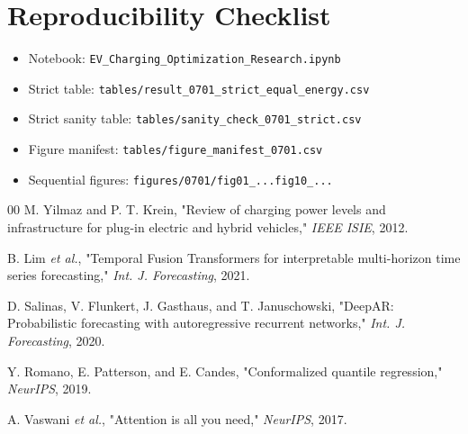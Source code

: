 \documentclass[journal]{IEEEtran}
\begin{document}
\section*{Reproducibility Checklist}
\begin{itemize}
    \item Notebook: \texttt{EV\_Charging\_Optimization\_Research.ipynb}
    \item Strict table: \texttt{tables/result\_0701\_strict\_equal\_energy.csv}
    \item Strict sanity table: \texttt{tables/sanity\_check\_0701\_strict.csv}
    \item Figure manifest: \texttt{tables/figure\_manifest\_0701.csv}
    \item Sequential figures: \texttt{figures/0701/fig01\_...fig10\_...}
\end{itemize}


\begin{thebibliography}{00}
M. Yilmaz and P. T. Krein, "Review of charging power levels and infrastructure for plug-in electric and hybrid vehicles," \emph{IEEE ISIE}, 2012.

B. Lim \emph{et al.}, "Temporal Fusion Transformers for interpretable multi-horizon time series forecasting," \emph{Int. J. Forecasting}, 2021.

D. Salinas, V. Flunkert, J. Gasthaus, and T. Januschowski, "DeepAR: Probabilistic forecasting with autoregressive recurrent networks," \emph{Int. J. Forecasting}, 2020.

Y. Romano, E. Patterson, and E. Candes, "Conformalized quantile regression," \emph{NeurIPS}, 2019.

A. Vaswani \emph{et al.}, "Attention is all you need," \emph{NeurIPS}, 2017.
\end{thebibliography}
\end{document}
